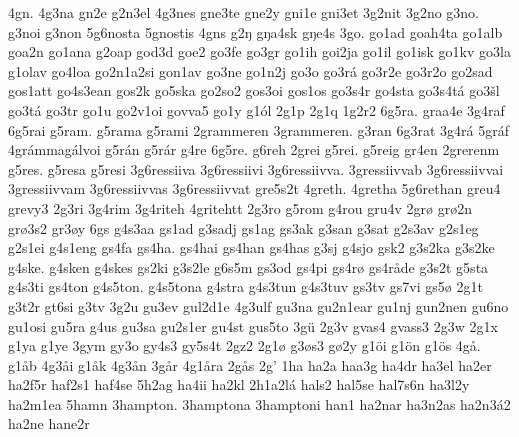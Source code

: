 {    4gn.
    4g3na
    gn2e
    g2n3el
    4g3nes
    gne3te
    gne2y
    gni1e
    gni3et
    3g2nit
    3g2no
    g3no.
    g3noi
    g3non
    5g6nosta
    5gnostis
    4gns
    g2ŋ
    gŋa4sk
    gŋe4s
    3go.
    go1ad
    goah4ta
    go1alb
    goa2n
    go1ana
    g2oap
    god3d
    goe2
    go3fe
    go3gr
    go1ih
    goi2ja
    go1il
    go1isk
    go1kv
    go3la
    g1olav
    go4loa
    go2n1a2si
    gon1av
    go3ne
    go1n2j
    go3o
    go3rá
    go3r2e
    go3r2o
    go2sad
    gos1att
    go4s3ean
    gos2k
    go5ska
    go2so2
    gos3oi
    gos1os
    go3s4r
    go4sta
    go3s4tá
    go3šl
    go3tá
    go3tr
    go1u
    go2v1oi
    govva5
    go1y
    g1ól
    2g1p
    2g1q
    1g2r2
    6g5ra.
    graa4e
    3g4raf
    6g5rai
    g5ram.
    g5rama
    g5rami
    2grammeren
    3grammeren.
    g3ran
    6g3rat
    3g4rá
    5gráf
    4grámmagálvoi
    g5rán
    g5rár
    g4re
    6g5re.
    g6reh
    2grei
    g5rei.
    g5reig
    gr4en
    2grerenm
    g5res.
    g5resa
    g5resi
    3g6ressiiva
    3g6ressiivi
    3g6ressiivva.
    3gressiivvab
    3g6ressiivvai
    3gressiivvam
    3g6ressiivvas
    3g6ressiivvat
    gre5s2t
    4greth.
    4gretha
    5g6rethan
    greu4
    grevy3
    2g3ri
    3g4rim
    3g4riteh
    4gritehtt
    2g3ro
    g5rom
    g4rou
    gru4v
    2grø
    grø2n
    grø3s2
    gr3øy
    6gs
    g4s3aa
    gs1ad
    g3sadj
    gs1ag
    gs3ak
    g3san
    g3sat
    g2s3av
    g2s1eg
    g2s1ei
    g4s1eng
    gs4fa
    gs4ha.
    gs4hai
    gs4han
    gs4has
    g3sj
    g4sjo
    gsk2
    g3s2ka
    g3s2ke
    g4ske.
    g4sken
    g4skes
    gs2ki
    g3s2le
    g6s5m
    gs3od
    gs4pi
    gs4rø
    gs4råde
    g3s2t
    g5sta
    g4s3ti
    gs4ton
    g4s5ton.
    g4s5tona
    g4stra
    g4s3tun
    g4s3tuv
    gs3tv
    gs7vi
    gs5ø
    2g1t
    g3t2r
    gt6si
    g3tv
    3g2u
    gu3ev
    gul2d1e
    4g3ulf
    gu3na
    gu2n1ear
    gu1nj
    gun2nen
    gu6no
    gu1osi
    gu5ra
    g4us
    gu3sa
    gu2s1er
    gu4st
    gus5to
    3gü
    2g3v
    gvas4
    gvass3
    2g3w
    2g1x
    g1ya
    g1ye
    3gym
    gy3o
    gy4s3
    gy5s4t
    2gz2
    2g1ø
    g3øs3
    gø2y
    g1öi
    g1ön
    g1ös
    4gå.
    g1åb
    4g3åi
    g1åk
    4g3ån
    3går
    4g1åra
    2gås
    2g'
    1ha
    ha2a
    haa3g
    ha4dr
    ha3el
    ha2er
    ha2f5r
    haf2s1
    haf4se
    5h2ag
    ha4ii
    ha2kl
    2h1a2lá
    hals2
    hal5se
    hal7s6n
    ha3l2y
    ha2m1ea
    5hamn
    3hampton.
    3hamptona
    3hamptoni
    han1
    ha2nar
    ha3n2as
    ha2n3á2
    ha2ne
    hane2r
}
